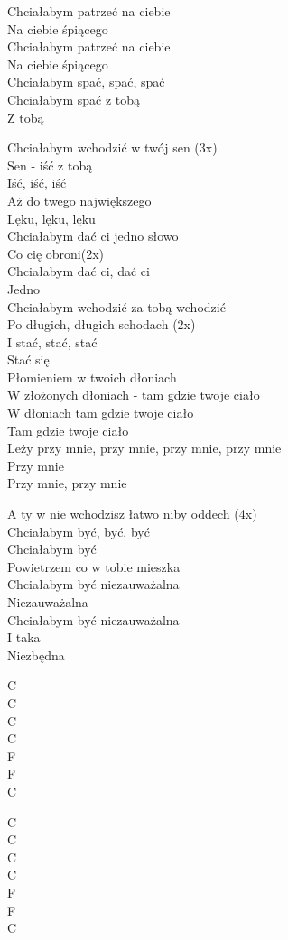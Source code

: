 \begin{text}
    Chciałabym patrzeć na ciebie\\
    Na ciebie śpiącego\\
    Chciałabym patrzeć na ciebie\\
    Na ciebie śpiącego\\
    Chciałabym spać, spać, spać\\
    Chciałabym spać z tobą\\
    Z tobą

    Chciałabym wchodzić w twój sen (3x)\\
    Sen - iść z tobą\\
    Iść, iść, iść\\
    Aż do twego największego\\
    Lęku, lęku, lęku\\
    Chciałabym dać ci jedno słowo\\
    Co cię obroni(2x)\\
    Chciałabym dać ci, dać ci\\
    Jedno\\
    Chciałabym wchodzić za tobą wchodzić\\
    Po długich, długich schodach (2x)\\
    I stać, stać, stać\\
    Stać się\\
    Płomieniem w twoich dłoniach\\
    W złożonych dłoniach - tam gdzie twoje ciało\\
    W dłoniach tam gdzie twoje ciało\\
    Tam gdzie twoje ciało\\
    Leży przy mnie, przy mnie, przy mnie, przy mnie\\
    Przy mnie\\
    Przy mnie, przy mnie

    A ty w nie wchodzisz łatwo niby oddech (4x)\\
    Chciałabym być, być, być\\
    Chciałabym być\\
    Powietrzem co w tobie mieszka\\
    Chciałabym być niezauważalna\\
    Niezauważalna\\
    Chciałabym być niezauważalna\\
    I taka\\
    Niezbędna
\end{text}
\begin{chord}
    C\\
    C\\
    C\\
    C\\
    F\\
    F\\
    C

    C\\
    C\\
    C\\
    C\\
    F\\
    F\\
    C
\end{chord}